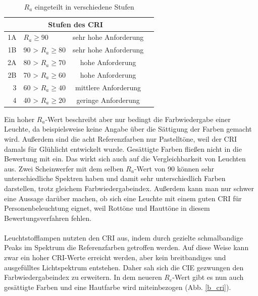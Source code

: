 	\begin{table}[htp] 
		\centering
		\begin{tabular}{rlcc}  %
		\toprule
		\multicolumn{3}{c}{\large\sffamily Stufen des CRI}\\ 							
		\midrule
		1A & $R_{a} \geq 90$ & sehr hohe Anforderung\\ 
		1B & 90 > $R_{a} \geq 80$ & sehr hohe Anforderung\\
		2A & 80 > $R_{a} \geq 70$ & hohe Anforderung\\
		2B & 70 > $R_{a} \geq 60$ & hohe Anforderung\\
		3 & 60 > $R_{a} \geq 40$ & mittlere Anforderung\\
		4 & 40 > $R_{a} \geq 20$ & geringe Anforderung\\
		\bottomrule
		\end{tabular}
		\caption{$R_{a}$ eingeteilt in verschiedene Stufen\protect\footnotemark}	
		\label{t_cri}
	\end{table}

Ein hoher $R_{a}$-Wert beschreibt aber nur bedingt die Farbwiedergabe einer Leuchte, da beispielsweise keine Angabe über die Sättigung der Farben gemacht wird. Außerdem sind die acht Referenzfarben nur Pastelltöne, weil der CRI damals für Glühlicht entwickelt wurde. Gesättigte Farben fließen nicht in die Bewertung mit ein.
Das wirkt sich auch auf die Vergleichbarkeit von Leuchten aus. Zwei Scheinwerfer mit dem selben $R_{a}$-Wert von 90 können sehr unterschiedliche Spektren haben und damit sehr unterschiedlich Farben darstellen, trotz gleichem Farbwiedergabeindex.
Außerdem kann man nur schwer eine Aussage darüber machen, ob sich eine Leuchte mit einem guten CRI für Personenbeleuchtung eignet, weil Rottöne und Hauttöne in diesem Bewertungsverfahren fehlen.\\\\
Leuchtstofflampen nutzten den CRI aus, indem durch gezielte schmalbandige Peaks im Spektrum die Referenzfarben getroffen werden. Auf diese Weise kann zwar ein hoher CRI-Werte erreicht werden, aber kein breitbandiges und ausgefülltes Lichtspektrum entstehen. Daher sah sich die CIE gezwungen den Farbwiedergabeindex zu erweitern. In dem neueren $R_{e}$-Wert gibt es nun auch gesättigte Farben und eine Hautfarbe wird miteinbezogen (Abb. \ref{b_cri}).

